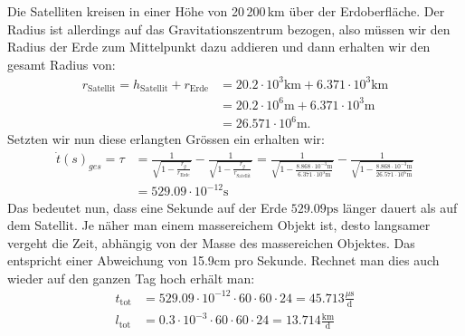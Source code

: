 \begin{refsection}
Die Satelliten kreisen in einer Höhe von 20\,200\,km über der Erdoberfläche. Der Radius ist allerdings auf das Gravitationszentrum bezogen, also müssen wir den Radius der Erde zum Mittelpunkt dazu addieren und dann erhalten wir den gesamt Radius von:
\begin{align*}
r_{\text{Satellit}} = h_{\text{Satellit}} + r_{\text{Erde}} & = 20.2 \cdot 10^3\text{km} + 6.371 \cdot 10^3\text{km} 
\\
& = 20.2 \cdot 10^6\text{m} + 6.371 \cdot 10^3\text{m} 
\\
& = 26.571 \cdot 10^6\text{m}.
\end{align*}
Setzten wir nun diese erlangten Grössen ein erhalten wir:
\begin{align*}
\dot t(s)_ {ges} = \tau
&=
\frac{1}{\sqrt{\displaystyle 1-\frac{r_g}{r_\text{Erde}}}} - \frac{1}{\sqrt{\displaystyle 1-\frac{r_g}{r_{\text{Satellit}}}}}
= \frac{1}{\sqrt{\displaystyle 1-\frac{8.868 \cdot 10^{-3}\text{m}}{ 6.371 \cdot 10^3\text{m}}}} - \frac{1}{\sqrt{\displaystyle 1-\frac{8.868 \cdot 10^{-3}\text{m}}{ 26.571 \cdot 10^6\text{m}}}}
\\
&= 529.09 \cdot 10^{-12}\text{s}
\end{align*}
Das bedeutet nun, dass eine Sekunde auf der Erde \( 529.09\text{ps} \) länger dauert als auf dem Satellit. Je näher man einem massereichem Objekt ist, desto langsamer vergeht die Zeit, abhängig von der Masse des massereichen Objektes. Das entspricht einer Abweichung von 15.9cm pro Sekunde. Rechnet man dies auch wieder auf den ganzen Tag hoch erhält man:
\begin{align*}
t_{\text{tot}} & = 529.09 \cdot 10^{-12} \cdot 60 \cdot 60 \cdot 24 = 45.713\frac{\mu{}\text{s}}{\text{d}}
\\
l_{\text{tot}} &= 0.3 \cdot 10^{-3} \cdot 60 \cdot 60 \cdot 24 = 13.714\frac{\text{km}}{\text{d}}
\end{align*}


\end{refsection}
